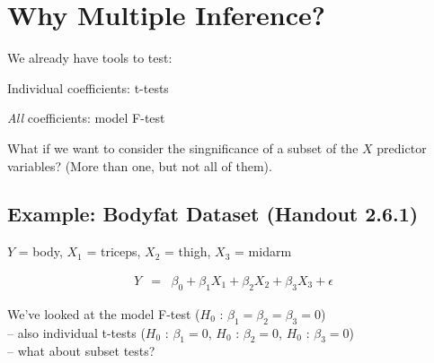 \documentclass[12pt]{notes}
\begin{document}

\section{Why Multiple Inference?}

We already have tools to test:
\bi
\item Individual coefficients: t-tests
\item \textit{All} coefficients: model F-test
\ei

\nspace
What if we want to consider the singnificance of a subset of the $X$ predictor variables? (More than one, but not all of them). 


\begin{minipage}[l][2cm][c]{\textwidth}
\end{minipage}

\subsection*{Example: Bodyfat Dataset (Handout 2.6.1)}
$Y$ = body, $X_1$ = triceps, $X_2$ = thigh, $X_3$ = midarm

\vspace{-1em}

\begin{eqnarray}
  Y & = & \beta_0 + \beta_1 X_1 + \beta_2 X_2 + \beta_3 X_3 + \epsilon \nonumber
\end{eqnarray}

We've looked at the model F-test ($H_0$ :
$\beta_1=\beta_2=\beta_3=0$)\\
-- also individual t-tests ($H_0$ : $\beta_1=0$, $H_0$ :
$\beta_2=0$,
$H_0$ : $\beta_3=0$)\\
-- what about subset tests?\\
\end{document}
